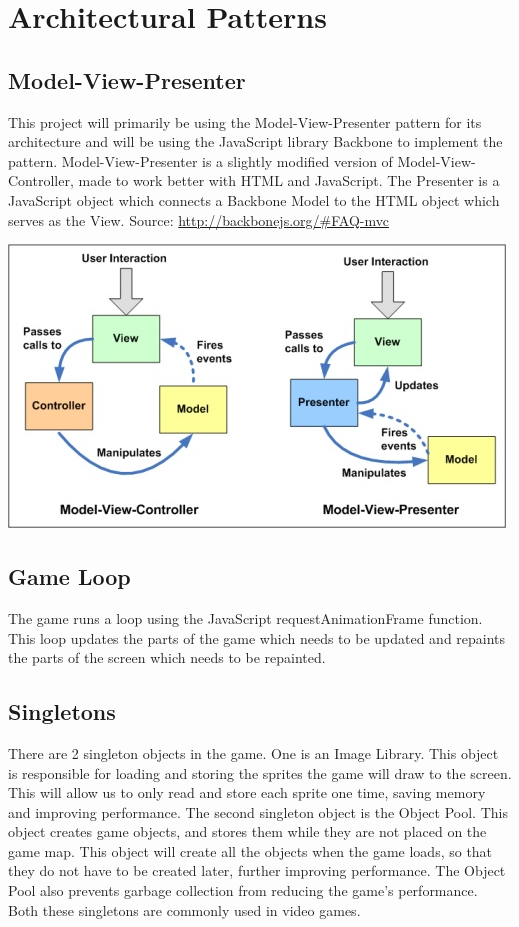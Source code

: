 \section{Architectural Patterns}

\subsection*{Model-View-Presenter}
This project will primarily be using the Model-View-Presenter pattern for its architecture and will 
be using the JavaScript library Backbone to implement the pattern. Model-View-Presenter is a slightly
modified version of Model-View-Controller, made to work better with HTML and JavaScript. The Presenter
is a JavaScript object which connects a Backbone Model to the HTML object which serves as the View.
Source: \url{http://backbonejs.org/#FAQ-mvc}

\includegraphics{pictures/mvc_mvp}

\subsection*{Game Loop}
The game runs a loop using the JavaScript requestAnimationFrame function. This loop updates the parts 
of the game which needs to be updated and repaints the parts of the screen which needs to be repainted.

\subsection*{Singletons}
There are 2 singleton objects in the game. One is an Image Library. This object is responsible for 
loading and storing the sprites the game will draw to the screen. This will allow us to only read and 
store each sprite one time, saving memory and improving performance. The second singleton object is 
the Object Pool. This object creates game objects, and stores them while they are not placed on the 
game map. This object will create all the objects when the game loads, so that they do not have to 
be created later, further improving performance. The Object Pool also prevents garbage collection 
from reducing the game's performance. Both these singletons are commonly used in video games.
